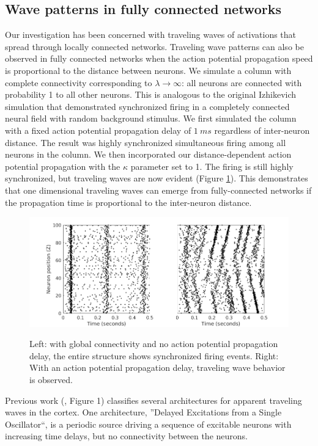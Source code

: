 \documentclass[a4paper,11pt]{article}
\begin{document}
\FloatBarrier

\subsection{Wave patterns in fully connected networks} \label{sub:delay}
Our investigation has been concerned with traveling waves of activations that spread through locally connected networks.
Traveling wave patterns can also be observed in fully connected networks when the action potential propagation speed is proportional to the distance between neurons.
We simulate a column with complete connectivity corresponding to $\lambda \rightarrow \infty$: all neurons are connected with probability 1 to all other neurons.
This is analogous to the original Izhikevich simulation \cite{izzy_code} that demonstrated synchronized firing in a completely connected neural field with random background stimulus.
We first simulated the column with a fixed action potential propagation delay of $1~ms$ regardless of inter-neuron distance.
The result was highly synchronized simultaneous firing among all neurons in the column.
We then incorporated our distance-dependent action potential propagation with the $\kappa$ parameter set to 1.
The firing is still highly synchronized, but traveling waves are now evident (Figure \ref{fig:delay_waves}).
This demonstrates that one dimensional traveling waves can emerge from fully-connected networks if the propagation time is proportional to the inter-neuron distance.
\begin{figure}[!ht]
 \caption{Left: with global connectivity and no action potential propagation delay, the entire structure shows synchronized firing events. Right: With an action potential propagation delay, traveling wave behavior is observed.}
 \centering
   \includegraphics[width=\textwidth]{fig/DelayWaves}  
 \label{fig:delay_waves}
\end{figure}
Previous work (\cite{ermentrout2001}, Figure 1) classifies several architectures for apparent traveling waves in the cortex.
One architecture, ''Delayed Excitations from a Single Oscillator``, is a periodic source driving a sequence of excitable neurons with increasing time delays, but no connectivity between the neurons.
\end{document}
